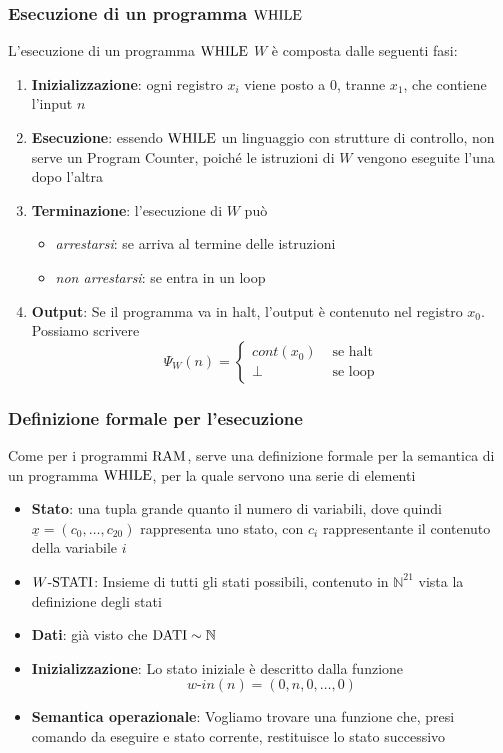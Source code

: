 \subsubsection{Esecuzione di un programma $\text{WHILE}$}
L'esecuzione di un programma $\text{WHILE}$ $W$ è composta dalle seguenti fasi: 
\begin{enumerate}
	\item \textbf{Inizializzazione}: ogni registro $x_i$ viene posto a $0$, tranne $x_1$, che contiene l'input $n$
	\item \textbf{Esecuzione}: essendo $\text{WHILE}$ un linguaggio con strutture di controllo, non serve un Program Counter, poiché le istruzioni di $W$ vengono eseguite l'una dopo l'altra
	\item \textbf{Terminazione}: l'esecuzione di $W$ può 
	\begin{itemize}
		\item \textit{arrestarsi}: se arriva al termine delle istruzioni
		\item \textit{non arrestarsi}: se entra in un loop
	\end{itemize}
	\item \textbf{Output}: Se il programma va in halt, l'output è contenuto nel registro $x_0$. Possiamo scrivere
	$$ \Psi_W (n) = \begin{cases}
		cont(x_0) & \text{ se halt} \\
		\bot & \text{ se loop}
	\end{cases}$$
\end{enumerate}

\subsubsection{Definizione formale per l'esecuzione}
Come per i programmi $\text{RAM}$, serve una definizione formale per la semantica di un programma $\text{WHILE}$, per la quale servono una serie di elementi
\begin{itemize}
	\item \textbf{Stato}: una tupla grande quanto il numero di variabili, dove quindi $\underline{x} = (c_0, \dots, c_{20})$ rappresenta uno stato, con $c_i$ rappresentante il contenuto della variabile $i$
	\item \textbf{$W\text{-STATI}$}: Insieme di tutti gli stati possibili, contenuto in $\mathbb{N}^{21}$ vista la definizione degli stati 
	\item \textbf{Dati}: già visto che $\text{DATI} \sim \mathbb{N}$
	\item \textbf{Inizializzazione}: Lo stato iniziale è descritto dalla funzione 
	$$ w\text{-}in(n) = (0, n, 0, \dots, 0) $$
	\item \textbf{Semantica operazionale}: Vogliamo trovare una funzione che, presi comando da eseguire e stato corrente, restituisce lo stato successivo
\end{itemize}

